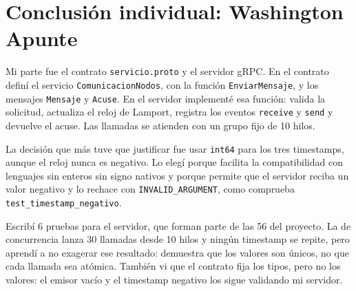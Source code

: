\section{Conclusión individual: Washington Apunte}

Mi parte fue el contrato \texttt{servicio.proto} y el servidor gRPC. En el
contrato definí el servicio \texttt{ComunicacionNodos}, con la función
\texttt{EnviarMensaje}, y los mensajes \texttt{Mensaje} y \texttt{Acuse}. En el
servidor implementé esa función: valida la solicitud, actualiza el reloj de
Lamport, registra los eventos \texttt{receive} y \texttt{send} y devuelve el
acuse. Las llamadas se atienden con un grupo fijo de 10 hilos.

La decisión que más tuve que justificar fue usar \texttt{int64} para los tres
timestamps, aunque el reloj nunca es negativo. Lo elegí porque facilita la
compatibilidad con lenguajes sin enteros sin signo nativos y porque permite que
el servidor reciba un valor negativo y lo rechace con
\texttt{INVALID\_ARGUMENT}, como comprueba \texttt{test\_timestamp\_negativo}.

Escribí 6 pruebas para el servidor, que forman parte de las 56 del proyecto.
La de concurrencia lanza 30 llamadas desde 10 hilos y ningún timestamp se
repite, pero aprendí a no exagerar ese resultado: demuestra que los valores son
únicos, no que cada llamada sea atómica. También vi que el contrato fija los
tipos, pero no los valores: el emisor vacío y el timestamp negativo los sigue
validando mi servidor.
